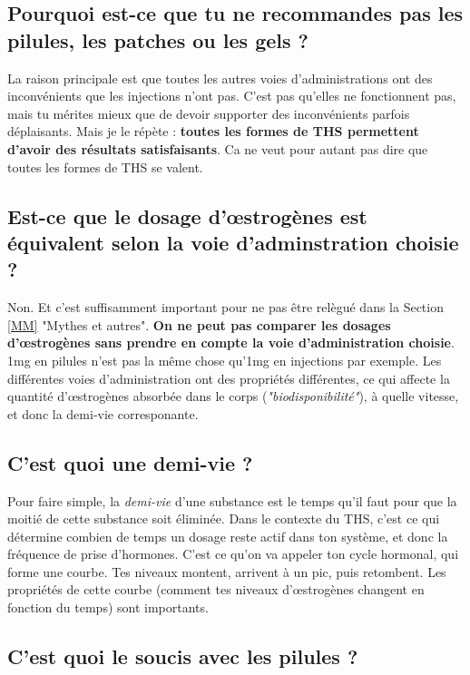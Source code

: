 \documentclass{article}
\begin{document}
\subsection{Pourquoi est-ce que tu ne recommandes pas les pilules, les patches ou les gels ?}

La raison principale est que toutes les autres voies d'administrations ont des inconvénients que les injections n'ont pas. C'est pas qu'elles ne fonctionnent pas, mais tu mérites mieux que de devoir supporter des inconvénients parfois déplaisants. Mais je le répète : \textbf{toutes les formes de THS permettent d'avoir des résultats satisfaisants}. Ca ne veut pour autant pas dire que toutes les formes de THS se valent.

\subsection{Est-ce que le dosage d'œstrogènes est équivalent selon la voie d'adminstration choisie ?}

Non. Et c'est suffisamment important pour ne pas être relègué dans la Section \ref{MM} "Mythes et autres". \textbf{On ne peut pas comparer les dosages d'œstrogènes sans prendre en compte la voie d'administration choisie}. 1mg en pilules n'est pas la même chose qu'1mg en injections par exemple. Les différentes voies d'administration ont des propriétés différentes, ce qui affecte la quantité d'œstrogènes absorbée dans le corps (\textit{"biodisponibilité"}), à quelle vitesse, et donc la demi-vie corresponante.

\subsection{C'est quoi une demi-vie ?}

Pour faire simple, la \textit{demi-vie} d'une substance est le temps qu'il faut pour que la moitié de cette substance soit éliminée. Dans le contexte du THS, c'est ce qui détermine combien de temps un dosage reste actif dans ton système, et donc la fréquence de prise d'hormones. C'est ce qu'on va appeler ton cycle hormonal, qui forme une courbe. Tes niveaux montent, arrivent à un pic, puis retombent. Les propriétés de cette courbe (comment tes niveaux d'œstrogènes changent en fonction du temps) sont importants.

\subsection{C'est quoi le soucis avec les pilules ?}
\end{document}
